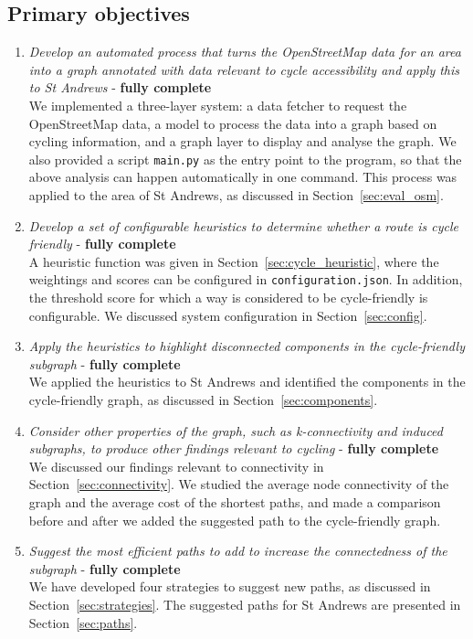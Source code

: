 \documentclass[12pt,a4paper]{report}
\begin{document}
\subsection{Primary objectives}
\begin{enumerate}
    \item \textit{Develop an automated process that turns the OpenStreetMap data for an area into a graph annotated with data relevant to cycle accessibility and apply this to St Andrews} - \textbf{fully complete}\\[1mm]
    We implemented a three-layer system: a data fetcher to request the OpenStreetMap data, a model to process the data into a graph based on cycling information, and a graph layer to display and analyse the graph. We also provided a script \texttt{main.py} as the entry point to the program, so that the above analysis can happen automatically in one command. This process was applied to the area of St Andrews, as discussed in Section~\ref{sec:eval_osm}.

    \item \textit{Develop a set of configurable heuristics to determine whether a route is cycle friendly} - \textbf{fully complete}\\[1mm]
    A heuristic function was given in Section~\ref{sec:cycle_heuristic}, where the weightings and scores can be configured in \texttt{configuration.json}. In addition, the threshold score for which a way is considered to be cycle-friendly is configurable. We discussed system configuration in Section~\ref{sec:config}.

    \item \textit{Apply the heuristics to highlight disconnected components in the cycle-friendly subgraph} - \textbf{fully complete}\\[1mm]
    We applied the heuristics to St Andrews and identified the components in the cycle-friendly graph, as discussed in Section~\ref{sec:components}.

    \item \textit{Consider other properties of the graph, such as k-connectivity and induced subgraphs, to produce other findings relevant to cycling} - \textbf{fully complete}\\[1mm]
    We discussed our findings relevant to connectivity in Section~\ref{sec:connectivity}. We studied the average node connectivity of the graph and the average cost of the shortest paths, and made a comparison before and after we added the suggested path to the cycle-friendly graph.

    \item \textit{Suggest the most efficient paths to add to increase the connectedness of the subgraph} - \textbf{fully complete}\\[1mm]
    We have developed four strategies to suggest new paths, as discussed in Section~\ref{sec:strategies}. The suggested paths for St Andrews are presented in Section~\ref{sec:paths}.
\end{enumerate}
\end{document}
